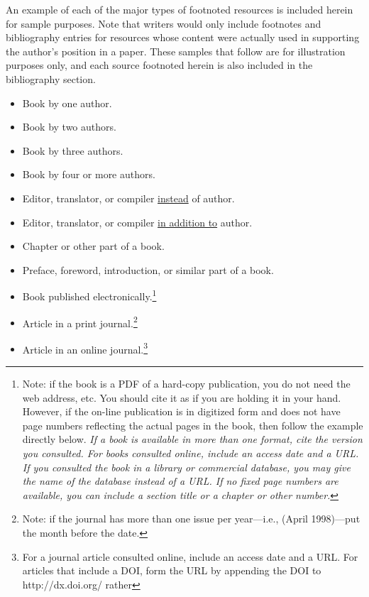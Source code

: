 \documentclass[raggedright]{turabian-researchpaper}
\begin{document}
An example of each of the major types of footnoted resources is included herein
for sample purposes. Note that writers would only include footnotes and
bibliography entries for resources whose content were actually used in
supporting the author's position in a paper. These samples that follow are for
illustration purposes only, and each source footnoted herein is also included in
the bibliography section.
\begin{itemize}
\item Book by one author.\autocite[65]{Turabian}
\item Book by two authors.\autocite[104--7]{Turabian}
\item Book by three authors.\autocite[11-12]{Turabian}
\item Book by four or more authors.\autocite[262]{Turabian}
\item Editor, translator, or compiler \ul{instead} of
  author.\autocite[91--92]{Turabian}
\item Editor, translator, or compiler \ul{in addition to}
  author.\autocite[22]{Turabian}
\item Chapter or other part of a book.\autocite[101--2]{Turabian}
\item Preface, foreword, introduction, or similar part of a
  book.\autocite[xx--xxi]{Turabian}
\item Book published electronically.\autocite{Turabian}\footnote{Note: if the
  book is a PDF of a hard-copy publication, you do not need the web address,
  etc. You should cite it as if you are holding it in your hand. However, if the
  on-line publication is in digitized form and does not have page numbers
  reflecting the actual pages in the book, then follow the example directly
  below. \emph{If a book is available in more than one format, cite the version
  you consulted. For books consulted online, include an access date and a URL.
  If you consulted the book in a library or commercial database, you may give
  the name of the database instead of a URL. If no fixed page numbers are
  available, you can include a section title or a chapter or other number.}}
\item Article in a print journal.\autocite[639]{Turabian}\footnote{Note: if the
  journal has more than one issue per year---i.e., (April 1998)---put the month
  before the date.}
\item Article in an online journal.\autocite{Turabian}\footnote{For a journal
  article consulted online, include an access date and a URL. For articles that
  include a DOI, form the URL by appending the DOI to http://dx.doi.org/ rather
}
\end{itemize}
\end{document}
